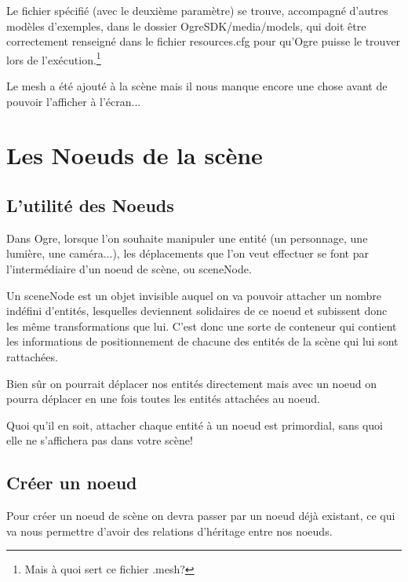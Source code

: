 \documentclass[10pt,a4paper]{report}
\begin{document}
Le fichier sp\'ecifi\'e (avec le deuxi\`eme param\`etre) se trouve, accompagn\'e d'autres mod\`eles d'exemples, dans le dossier OgreSDK/media/models, qui doit \^etre correctement renseign\'e dans le fichier resources.cfg pour qu'Ogre puisse le trouver lors de l'ex\'ecution.\footnote{Mais \`a quoi sert ce fichier .mesh?}

Le mesh a \'et\'e ajout\'e \`{a} la sc\`ene mais il nous manque encore une chose avant de pouvoir l'afficher \`{a} l'\'ecran...













\section{Les Noeuds de la sc\`ene}



\subsection{L'utilit\'e des Noeuds}

Dans Ogre, lorsque l'on souhaite manipuler une entit\'e (un personnage, une lumi\`ere, une cam\'era...), les d\'eplacements que l'on veut effectuer se font par l'interm\'ediaire d'un noeud de sc\`ene, ou sceneNode.

Un sceneNode est un objet invisible auquel on va pouvoir attacher un nombre ind\'efini d'entit\'es, lesquelles deviennent solidaires de ce noeud et subissent donc les m\^eme transformations que lui. C'est donc une sorte de conteneur qui contient les informations de positionnement de chacune des entit\'es de la sc\`ene qui lui sont rattach\'ees.

Bien s\^ur on pourrait d\'eplacer nos entit\'es directement mais avec un noeud on pourra d\'eplacer en une fois toutes les entit\'es attach\'ees au noeud.

Quoi qu'il en soit, attacher chaque entit\'e \`{a} un noeud est primordial, sans quoi elle ne s'affichera pas dans votre sc\`ene!



\subsection{Cr\'eer un noeud}

Pour cr\'eer un noeud de sc\`ene on devra passer par un noeud d\'ej\`{a} existant, ce qui va nous permettre d'avoir des relations d'h\'eritage entre nos noeuds.\newline
\end{document}
